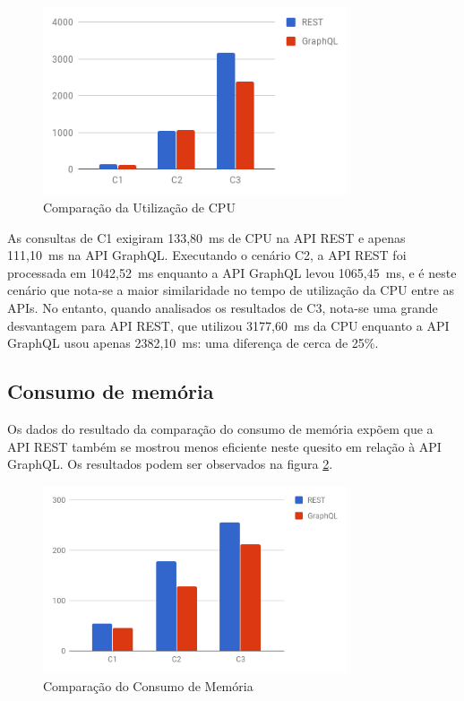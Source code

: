 \begin{figure}[htbp]
    \centering
    \includegraphics[width=0.8\textwidth]{figuras/q1-cpu.png}
    \caption{Comparação da Utilização de CPU}
    \label{fig:q1-cpu}
\end{figure}

As consultas de C1 exigiram 133,80~ms de CPU na API REST e apenas 111,10~ms na API GraphQL. Executando o cenário C2, a API REST foi processada em 1042,52~ms enquanto a API GraphQL levou 1065,45~ms, e é neste cenário que nota-se a maior similaridade no tempo de utilização da CPU entre as APIs. No entanto, quando analisados os resultados de C3, nota-se uma grande desvantagem para API REST, que utilizou 3177,60~ms da CPU enquanto a API GraphQL usou apenas 2382,10~ms: uma diferença de cerca de 25\%.
    
\subsection{Consumo de memória}

Os dados do resultado da comparação do consumo de memória expõem que a API REST também se mostrou menos eficiente neste quesito em relação à API GraphQL. Os resultados podem ser observados na figura \ref{fig:q1-mem}.

\begin{figure}[htbp]
    \centering
    \includegraphics[width=0.8\textwidth]{figuras/q1-memory.png}
    \caption{Comparação do Consumo de Memória}
    \label{fig:q1-mem}
\end{figure}

